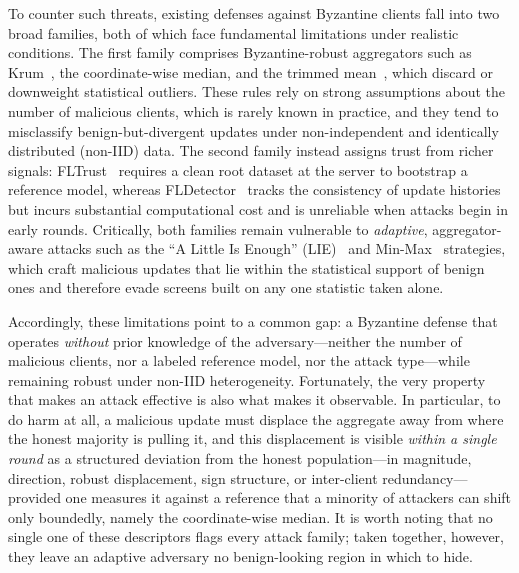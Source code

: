 \documentclass[journal]{IEEEtran}
\begin{document}
To counter such threats, existing defenses against Byzantine clients fall into two broad families, both of which face fundamental limitations under realistic conditions. The first family comprises Byzantine-robust aggregators such as Krum~\cite{blanchard2017machine}, the coordinate-wise median, and the trimmed mean~\cite{yin2018byzantine}, which discard or downweight statistical outliers. These rules rely on strong assumptions about the number of malicious clients, which is rarely known in practice, and they tend to misclassify benign-but-divergent updates under non-independent and identically distributed (non-IID) data. The second family instead assigns trust from richer signals: FLTrust~\cite{cao2020fltrust} requires a clean root dataset at the server to bootstrap a reference model, whereas FLDetector~\cite{zhang2022fldetector} tracks the consistency of update histories but incurs substantial computational cost and is unreliable when attacks begin in early rounds. Critically, both families remain vulnerable to \emph{adaptive}, aggregator-aware attacks such as the ``A Little Is Enough'' (LIE)~\cite{baruch2019little} and Min-Max~\cite{shejwalkar2021manipulating} strategies, which craft malicious updates that lie within the statistical support of benign ones and therefore evade screens built on any one statistic taken alone.

Accordingly, these limitations point to a common gap: a Byzantine defense that operates \emph{without} prior knowledge of the adversary---neither the number of malicious clients, nor a labeled reference model, nor the attack type---while remaining robust under non-IID heterogeneity. Fortunately, the very property that makes an attack effective is also what makes it observable. In particular, to do harm at all, a malicious update must displace the aggregate away from where the honest majority is pulling it, and this displacement is visible \emph{within a single round} as a structured deviation from the honest population---in magnitude, direction, robust displacement, sign structure, or inter-client redundancy---provided one measures it against a reference that a minority of attackers can shift only boundedly, namely the coordinate-wise median. It is worth noting that no single one of these descriptors flags every attack family; taken together, however, they leave an adaptive adversary no benign-looking region in which to hide.
\end{document}
